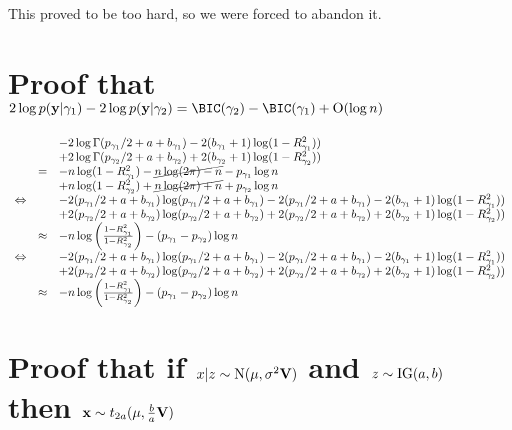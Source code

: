 \documentclass{amsart}[12pt]
\theoremstyle{definition}
\begin{document}
This proved to be too hard, so we were forced to abandon it.

\section{Proof that $2 \log p(\vy | \gamma_1) - 2 \log p(\vy | \gamma_2) = \BIC(\gamma_2) - \BIC(\gamma_1) + \BigO(\log n)$}

$$
\begin{array}{rrl}
&&-2 \log\Gamma(p_{\gamma_1}/2 + a + b_{\gamma_1}) - 2(b_{\gamma_1} + 1) \log(1 - R^2_{\gamma_1})) \\
&&+2 \log\Gamma(p_{\gamma_2}/2 + a + b_{\gamma_2}) + 2(b_{\gamma_2} + 1) \log(1 - R^2_{\gamma_2})) \\
&=& -n \log(1 - R_{\gamma_1}^2) -\cancel{n \log(2 \pi) - n} - p_{\gamma_1} \log n \\
&&+n \log(1 - R_{\gamma_2}^2) +\cancel{n \log(2 \pi) + n} + p_{\gamma_2} \log n \\
\Leftrightarrow&&-2 (p_{\gamma_1}/2 + a + b_{\gamma_1})\log(p_{\gamma_1}/2 + a + b_{\gamma_1}) - 2(p_{\gamma_1}/2 + a + b_{\gamma_1}) - 2(b_{\gamma_1} + 1) \log(1 - R^2_{\gamma_1})) \\
&&+2 (p_{\gamma_2}/2 + a + b_{\gamma_2})\log(p_{\gamma_2}/2 + a + b_{\gamma_2}) + 2(p_{\gamma_2}/2 + a + b_{\gamma_2}) + 2(b_{\gamma_2} + 1) \log(1 - R^2_{\gamma_2})) \\
&\approx& -n \log \left(\frac{1 - R_{\gamma_1}^2}{1 - R_{\gamma_2}^2} \right) - (p_{\gamma_1} - p_{\gamma_2}) \log n \\
\Leftrightarrow&&-2 (p_{\gamma_1}/2 + a + b_{\gamma_1})\log(p_{\gamma_1}/2 + a + b_{\gamma_1}) - 2(p_{\gamma_1}/2 + a + b_{\gamma_1}) - 2(b_{\gamma_1} + 1) \log(1 - R^2_{\gamma_1})) \\
&&+2 (p_{\gamma_2}/2 + a + b_{\gamma_2})\log(p_{\gamma_2}/2 + a + b_{\gamma_2}) + 2(p_{\gamma_2}/2 + a + b_{\gamma_2}) + 2(b_{\gamma_2} + 1) \log(1 - R^2_{\gamma_2})) \\
&\approx& -n \log \left(\frac{1 - R_{\gamma_1}^2}{1 - R_{\gamma_2}^2} \right) - (p_{\gamma_1} - p_{\gamma_2}) \log n
\end{array}
$$

\section{Proof that if $x|z \sim \text{N}(\mu, \sigma^2 {\bf V})$ and $z \sim \text{IG}(a, b)$ then ${\bf x} \sim t_{2a}(\mu, \frac{b}{a}{\bf V})$}
\end{document}
